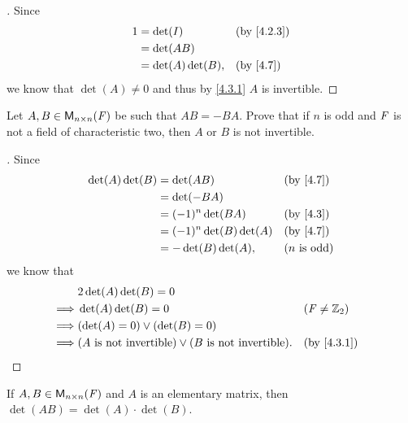 \begin{proof}[]
	Since
	\begin{align*}
		1 & = \det(I)          &  & \by{4.2.3} \\
		  & = \det(AB)                         \\
		  & = \det(A) \det(B), &  & \by{4.7}
	\end{align*}
	we know that \(\det(A) \neq 0\) and thus by \cref{4.3.1} \(A\) is invertible.
\end{proof}

\begin{ex}\label{ex:4.3.17}
	Let \(A, B \in \ms[n][n][\F]\) be such that \(AB = -BA\).
	Prove that if \(n\) is odd and \(\mathit{F}\) is not a field of characteristic two, then \(A\) or \(B\) is not invertible.
\end{ex}

\begin{proof}[]
	Since
	\begin{align*}
		\det(A) \det(B) & = \det(AB)               &  & \by{4.7}              \\
		                & = \det(-BA)                                         \\
		                & = (-1)^n \det(BA)        &  & \by{4.3}              \\
		                & = (-1)^n \det(B) \det(A) &  & \by{4.7}              \\
		                & = -\det(B) \det(A),      &  & \text{(\(n\) is odd)}
	\end{align*}
	we know that
	\begin{align*}
		         & 2 \det(A) \det(B) = 0                                                                 \\
		\implies & \det(A) \det(B) = 0                                               &  & (\F \neq \Z_2) \\
		\implies & (\det(A) = 0) \lor (\det(B) = 0)                                                      \\
		\implies & (A \text{ is not invertible}) \lor (B \text{ is not invertible}). &  & \by{4.3.1}
	\end{align*}
\end{proof}

\begin{ex}\label{ex:4.3.18}
	If \(A, B \in \ms[n][n][\F]\) and \(A\) is an elementary matrix, then \(\det(AB) = \det(A) \cdot \det(B)\).
\end{ex}

